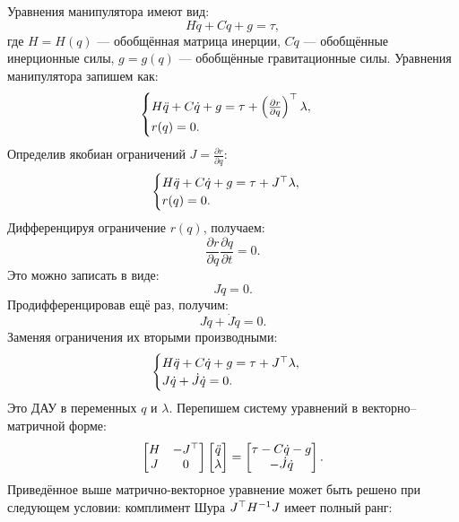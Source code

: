 Уравнения манипулятора имеют вид:
%
\begin{equation}
	{H} \ddot{{q}} + {C} \dot{{q}} + {g} = \tau,
\end{equation}
%
где ${H}={H}({q})$ --- обобщённая матрица инерции, ${C}\dot{{q}}$ --- обобщённые инерционные силы, ${g}={g}({q})$ --- обобщённые гравитационные силы.
Уравнения манипулятора запишем как:
%
\begin{equation}
	\begin{cases}
		{H} \ddot{{q}} + {C} \dot{{q}} + {g} = \tau + \left( \frac{\partial {r}}{\partial {q}} \right)^\top \lambda,
		\\
		{r}({q}) = 0.
	\end{cases}
\end{equation}
%
Определив якобиан ограничений ${J} = \frac{\partial {r}}{\partial {q}}$:
%
\begin{equation}
	\begin{cases}
		{H} \ddot{{q}} + {C} \dot{{q}} + {g} = \tau + {J}^\top \lambda,
		\\
		{r}({q}) = 0.
	\end{cases}
\end{equation}
Дифференцируя ограничение ${r}({q})$, получаем:
%
\begin{equation}
	\frac{\partial {r}}{\partial {q}} \frac{\partial {q}}{\partial t} = 0.
\end{equation}
%
Это можно записать в виде:
%
\begin{equation}
	{J} \dot{{q}} = 0.
\end{equation}
%
Продифференцировав ещё раз, получим:
%
\begin{equation}
	{J} \ddot{{q}} + \dot{{J}} \dot{{q}} = 0.
\end{equation}
%
Заменяя ограничения их вторыми производными:
%
\begin{equation}
	\begin{cases}
		{H} \ddot{{q}} + {C} \dot{{q}} + {g} = \tau + {J}^\top \lambda,
		\\
		{J} \dot{{q}} + \dot{{J}} \dot{{q}} = 0.
	\end{cases}
\end{equation}
%
Это ДАУ в переменных ${q}$ и $\lambda$. Перепишем систему уравнений в векторно--матричной форме:
%
\begin{equation}
	\begin{bmatrix}
		{H} & -{J}^\top \\
		{J} & 0
	\end{bmatrix}
	\begin{bmatrix}
		\ddot{{q}} \\
		\lambda
	\end{bmatrix}
	=
	\begin{bmatrix}
		\tau - {C} \dot{{q}} - {g} \\
		-\dot{{J}} \dot{{q}}
	\end{bmatrix}.
\end{equation}
Приведённое выше матрично-векторное уравнение может быть решено при следующем условии: комплимент Шура ${J}^\top {H}^{-1}{J}$ имеет полный ранг:

